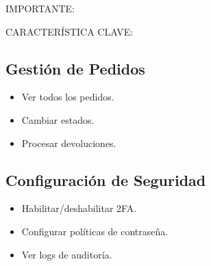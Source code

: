 \documentclass[12pt,a4paper,oneside]{book}
\begin{document}
\begin{alert}{IMPORTANTE:}
\begin{info}{CARACTERÍSTICA CLAVE:}
\subsection{Gestión de Pedidos}
\begin{itemize}
    \item Ver todos los pedidos.
    \item Cambiar estados.
    \item Procesar devoluciones.
\end{itemize}

\subsection{Configuración de Seguridad}
\begin{itemize}
    \item Habilitar/deshabilitar 2FA.
    \item Configurar políticas de contraseña.
    \item Ver logs de auditoría.
\end{itemize}


\end{info}
\end{alert}
\end{document}
